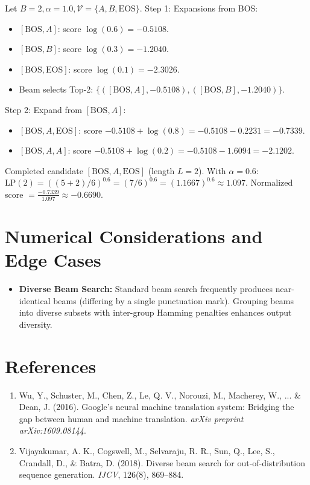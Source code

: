 \documentclass[11pt,a4paper]{article}
\theoremstyle{definition}
\begin{document}
Let $B=2, \alpha = 1.0, \mathcal{V} = \{A, B, \text{EOS}\}$.
Step 1: Expansions from BOS:
\begin{itemize}
    \item $[\text{BOS}, A]$: score $\log(0.6) = -0.5108$.
    \item $[\text{BOS}, B]$: score $\log(0.3) = -1.2040$.
    \item $[\text{BOS}, \text{EOS}]$: score $\log(0.1) = -2.3026$.
    \item Beam selects Top-2: $\{([\text{BOS}, A], -0.5108), ([\text{BOS}, B], -1.2040)\}$.
\end{itemize}
Step 2: Expand from $[\text{BOS}, A]$:
\begin{itemize}
    \item $[\text{BOS}, A, \text{EOS}]$: score $-0.5108 + \log(0.8) = -0.5108 - 0.2231 = -0.7339$.
    \item $[\text{BOS}, A, A]$: score $-0.5108 + \log(0.2) = -0.5108 - 1.6094 = -2.1202$.
\end{itemize}
Completed candidate $[\text{BOS}, A, \text{EOS}]$ (length $L=2$).
With $\alpha = 0.6$: $\text{LP}(2) = ((5+2)/6)^{0.6} = (7/6)^{0.6} = (1.1667)^{0.6} \approx 1.097$.
Normalized score $= \frac{-0.7339}{1.097} \approx -0.6690$.

\section{Numerical Considerations and Edge Cases}

\begin{itemize}
    \item \textbf{Diverse Beam Search:} Standard beam search frequently produces near-identical beams (differing by a single punctuation mark). Grouping beams into diverse subsets with inter-group Hamming penalties enhances output diversity.
\end{itemize}

\section{References}
\begin{enumerate}
    \item Wu, Y., Schuster, M., Chen, Z., Le, Q. V., Norouzi, M., Macherey, W., ... & Dean, J. (2016). Google's neural machine translation system: Bridging the gap between human and machine translation. \emph{arXiv preprint arXiv:1609.08144}.
    \item Vijayakumar, A. K., Cogswell, M., Selvaraju, R. R., Sun, Q., Lee, S., Crandall, D., & Batra, D. (2018). Diverse beam search for out-of-distribution sequence generation. \emph{IJCV}, 126(8), 869--884.
\end{enumerate}
\end{document}
